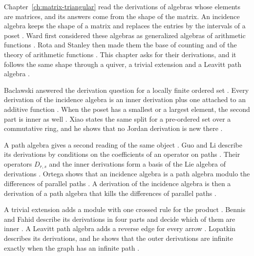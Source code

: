 Chapter~\ref{ch:matrix-triangular} read the derivations of algebras whose elements
are matrices, and its answers come from the shape of the matrix. An incidence
algebra keeps the shape of a matrix and replaces the entries by the intervals of a
poset \cite[p.~1358]{Xiao2015}. Ward first considered these algebras as generalized
algebras of arithmetic functions \cite[p.~1358]{Xiao2015}. Rota and Stanley then
made them the base of counting and of the theory of arithmetic functions
\cite[p.~1358]{Xiao2015}. This chapter asks for their derivations, and it
follows the same shape through a quiver, a trivial extension and a Leavitt path
algebra \cite[p.~59]{Lopatkin2019}.

Baclawski answered the derivation question for a locally finite ordered set
\cite[p.~352]{Baclawski1972}. Every derivation of the incidence algebra is an inner
derivation plus one attached to an additive function
\cite[Theorem~2, p.~352]{Baclawski1972}. When the poset has a smallest or a largest
element, the second part is inner as well \cite[p.~354]{Baclawski1972}. Xiao states
the same split for a pre-ordered set over a commutative ring, and he shows that no
Jordan derivation is new there \cite[Theorem~3.3, p.~1366]{Xiao2015}.

A path algebra gives a second reading of the same object \cite[p.~81]{LiWei2018}.
Guo and Li describe its derivations by conditions on the coefficients of an operator
on paths \cite[Theorem~2.3, p.~548]{GuoLi2014}. Their operators $D_{r,s}$ and the
inner derivations form a basis of the Lie algebra of derivations
\cite[Theorem~3.4, p.~555]{GuoLi2014}. Ortega shows that an incidence algebra is a
path algebra modulo the differences of parallel paths \cite[p.~232]{Ortega2006}. A
derivation of the incidence algebra is then a derivation of a path algebra that
kills the differences of parallel paths \cite[p.~232]{Ortega2006}.

A trivial extension adds a module with one crossed rule for the product
\cite[p.~4]{BennisFahid2017}. Bennis and Fahid describe its derivations in four
parts and decide which of them are inner
\cite[Theorem~3.12, p.~14]{BennisFahid2017}. A Leavitt path algebra adds a reverse
edge for every arrow \cite[p.~61]{Lopatkin2019}. Lopatkin describes its derivations,
and he shows that the outer derivations are infinite exactly when the graph has an
infinite path \cite[Corollary~3.8, p.~79]{Lopatkin2019}.

